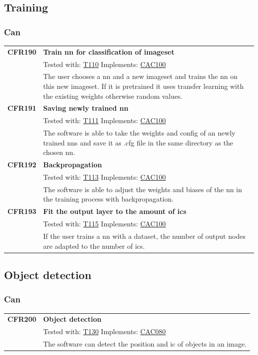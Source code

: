 \documentclass[parskip=full]{scrartcl}
\begin{document}
\subsection{Training}
\subsubsection{Can}
\begin{tabular}{p{2cm}p{11.4cm}}
\textbf{CFR190} \hypertarget{CFR110} & \textbf{Train \gls{nn} for classification of imageset}\\
& Tested with: \hyperlink{T110}{T110} Implements: \hyperlink{CAC100}{CAC100} \\
& The user chooses a \gls{nn} and a new imageset and trains the \gls{nn} on this new imageset. If it is pretrained it uses transfer learning with the existing weights otherwise random values.\\
\textbf {CFR191} \hypertarget{CFR111} & \textbf{Saving newly trained \gls{nn}} \\
& Tested with: \hyperlink{T111}{T111} Implements: \hyperlink{CAC100}{CAC100} \\
& The software is able to take the weights and config of an newly trained \glspl{nn} and save it as .cfg file in the same directory as the chosen \gls{nn}. \\
\textbf {CFR192} \hypertarget{CFR113} & \textbf{Backpropagation} \\
& Tested with: \hyperlink{T113}{T113} Implements: \hyperlink{CAC100}{CAC100} \\
& The software is able to adjust the weights and biases of the \gls{nn} in the training process with backpropagation.\\
\textbf{CFR193} \hypertarget{CFR115} & \textbf{Fit the output layer to the amount of \glspl{ic}}\\
& Tested with: \hyperlink{T115}{T115} Implements: \hyperlink{CAC100}{CAC100} \\
& If the user trains a \gls{nn} with a dataset, the number of output nodes are adapted to the number of \glspl{ic}.\\
\end{tabular}

\subsection{Object detection}
\subsubsection{Can}
\begin{tabular}{p{2cm}p{11.4cm}}
\textbf {CFR200} \hypertarget{CFR130} & \textbf{Object detection} \\
& Tested with: \hyperlink{T130}{T130} Implements: \hyperlink{CAC080}{CAC080} \\
& The software can detect the position and \gls{ic} of objects in an image.\\
\end{tabular}
\end{document}
